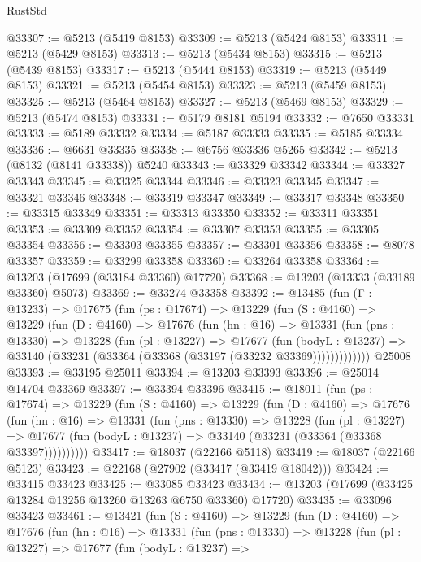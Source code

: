 \begin{lexlean}{RustStd}
\begin{coremodule}
@33307 := @5213 (@5419 @8153)
@33309 := @5213 (@5424 @8153)
@33311 := @5213 (@5429 @8153)
@33313 := @5213 (@5434 @8153)
@33315 := @5213 (@5439 @8153)
@33317 := @5213 (@5444 @8153)
@33319 := @5213 (@5449 @8153)
@33321 := @5213 (@5454 @8153)
@33323 := @5213 (@5459 @8153)
@33325 := @5213 (@5464 @8153)
@33327 := @5213 (@5469 @8153)
@33329 := @5213 (@5474 @8153)
@33331 := @5179 @8181 @5194
@33332 := @7650 @33331
@33333 := @5189 @33332
@33334 := @5187 @33333
@33335 := @5185 @33334
@33336 := @6631 @33335
@33338 := @6756 @33336 @5265
@33342 := @5213 (@8132 (@8141 @33338)) @5240
@33343 := @33329 @33342
@33344 := @33327 @33343
@33345 := @33325 @33344
@33346 := @33323 @33345
@33347 := @33321 @33346
@33348 := @33319 @33347
@33349 := @33317 @33348
@33350 := @33315 @33349
@33351 := @33313 @33350
@33352 := @33311 @33351
@33353 := @33309 @33352
@33354 := @33307 @33353
@33355 := @33305 @33354
@33356 := @33303 @33355
@33357 := @33301 @33356
@33358 := @8078 @33357
@33359 := @33299 @33358
@33360 := @33264 @33358
@33364 := @13203 (@17699 (@33184 @33360) @17720)
@33368 := @13203 (@13333 (@33189 @33360) @5073)
@33369 := @33274 @33358
@33392 := @13485
    (fun (Γ : @13233) =>
    @17675
      (fun (ps : @17674) =>
      @13229
        (fun (S : @4160) =>
        @13229
          (fun (D : @4160) =>
          @17676
            (fun (hn : @16) =>
            @13331
              (fun (pns : @13330) =>
              @13228
                (fun (pl : @13227) =>
                @17677
                  (fun (bodyL : @13237) =>
                  @33140 (@33231 (@33364 (@33368 (@33197 (@33232 @33369)))))))))))))
    @25008
@33393 := @33195 @25011
@33394 := @13203 @33393
@33396 := @25014 @14704 @33369
@33397 := @33394 @33396
@33415 := @18011
    (fun (ps : @17674) =>
    @13229
      (fun (S : @4160) =>
      @13229
        (fun (D : @4160) =>
        @17676
          (fun (hn : @16) =>
          @13331
            (fun (pns : @13330) =>
            @13228
              (fun (pl : @13227) =>
              @17677 (fun (bodyL : @13237) => @33140 (@33231 (@33364 (@33368 @33397))))))))))
@33417 := @18037 (@22166 @5118)
@33419 := @18037 (@22166 @5123)
@33423 := @22168 (@27902 (@33417 (@33419 @18042)))
@33424 := @33415 @33423
@33425 := @33085 @33423
@33434 := @13203 (@17699 (@33425 @13284 @13256 @13260 @13263 @6750 @33360) @17720)
@33435 := @33096 @33423
@33461 := @13421
    (fun (S : @4160) =>
    @13229
      (fun (D : @4160) =>
      @17676
        (fun (hn : @16) =>
        @13331
          (fun (pns : @13330) =>
          @13228
            (fun (pl : @13227) =>
            @17677
              (fun (bodyL : @13237) =>

\end{coremodule}
\end{lexlean}
